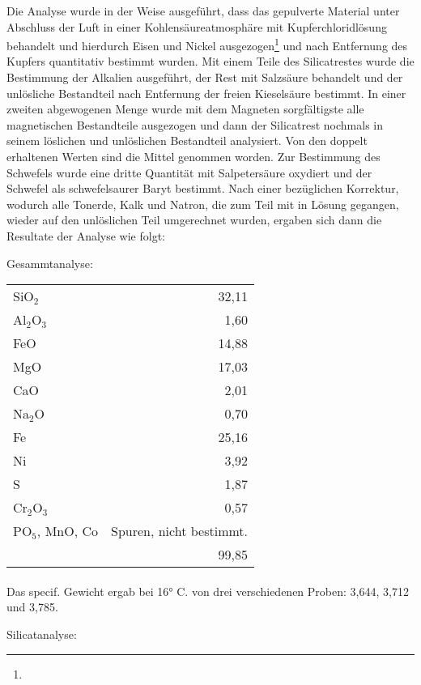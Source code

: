 \documentclass[a4paper, 11pt, oneside]{article}
\begin{document}
Die Analyse wurde in der Weise ausgeführt, dass das gepulverte Material unter Abschluss der Luft in einer Kohlensäureatmosphäre mit Kupferchloridlösung behandelt und hierdurch Eisen und Nickel ausgezogen\footnote{} und nach Entfernung des Kupfers quantitativ bestimmt wurden. Mit einem Teile des Silicatrestes wurde die Bestimmung der Alkalien ausgeführt, der Rest mit Salzsäure behandelt und der unlösliche Bestandteil nach Entfernung der freien Kieselsäure bestimmt. In einer zweiten abgewogenen Menge wurde mit dem Magneten sorgfältigste alle magnetischen Bestandteile ausgezogen und dann der Silicatrest nochmals in seinem löslichen und unlöslichen Bestandteil analysiert. Von den doppelt erhaltenen Werten sind die Mittel genommen worden. Zur Bestimmung des Schwefels wurde eine dritte Quantität mit Salpetersäure oxydiert und der Schwefel als schwefelsaurer Baryt bestimmt. Nach einer bezüglichen Korrektur, wodurch alle Tonerde, Kalk und Natron, die zum Teil mit in Lösung gegangen, wieder auf den unlöslichen Teil umgerechnet wurden, ergaben sich dann die Resultate der Analyse wie folgt:
\clearpage
\begin{center}
Gesammtanalyse:
\end{center}
\begin{center}
\begin{tabular}{ l r }
    SiO$_{2}$ & 32,11\\
    Al$_{2}$O$_{3}$ & 1,60\\
    FeO & 14,88\\
    MgO & 17,03\\
    CaO & 2,01\\
    Na$_{2}$O & 0,70\\
    Fe & 25,16\\
    Ni & 3,92\\
    S & 1,87\\
    Cr$_{2}$O$_{3}$ & 0,57\\
    PO$_{5}$, MnO, Co & Spuren, nicht bestimmt.\\
     & 99,85
\end{tabular}
\end{center}
\paragraph{}
Das specif. Gewicht ergab bei 16° C. von drei verschiedenen Proben: 3,644, 3,712 und 3,785.
\begin{center}
Silicatanalyse:
\end{center}
\end{document}
